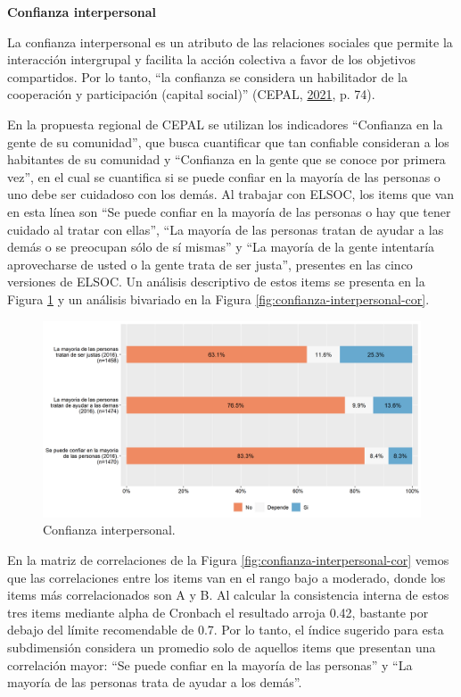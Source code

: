 \documentclass[
  12pt,
]{book}
\begin{document}
\textbf{Confianza interpersonal}

La confianza interpersonal es un atributo de las relaciones sociales que permite la interacción intergrupal y facilita la acción colectiva a favor de los objetivos compartidos. Por lo tanto, ``la confianza se considera un habilitador de la cooperación y participación (capital social)'' (CEPAL, \protect\hyperlink{ref-cepal_cohesion_2021}{2021}, p. 74).

En la propuesta regional de CEPAL se utilizan los indicadores ``Confianza en la gente de su comunidad'', que busca cuantificar que tan confiable consideran a los habitantes de su comunidad y ``Confianza en la gente que se conoce por primera vez'', en el cual se cuantifica si se puede confiar en la mayoría de las personas o uno debe ser cuidadoso con los demás. Al trabajar con ELSOC, los items que van en esta línea son ``Se puede confiar en la mayoría de las personas o hay que tener cuidado al tratar con ellas'', ``La mayoría de las personas tratan de ayudar a las demás o se preocupan sólo de sí mismas'' y ``La mayoría de la gente intentaría aprovecharse de usted o la gente trata de ser justa'', presentes en las cinco versiones de ELSOC. Un análisis descriptivo de estos items se presenta en la Figura \ref{fig:confianza-interpersonal} y un análisis bivariado en la Figura \ref{fig:confianza-interpersonal-cor}.

\begin{figure}[H]

{\centering \includegraphics[width=1\linewidth,height=1\textheight]{output/graphs/confianza-interpersonal} 

}

\caption{Confianza interpersonal.}\label{fig:confianza-interpersonal}
\end{figure}

En la matriz de correlaciones de la Figura \ref{fig:confianza-interpersonal-cor} vemos que las correlaciones entre los items van en el rango bajo a moderado, donde los items más correlacionados son A y B. Al calcular la consistencia interna de estos tres items mediante alpha de Cronbach el resultado arroja 0.42, bastante por debajo del límite recomendable de 0.7. Por lo tanto, el índice sugerido para esta subdimensión considera un promedio solo de aquellos items que presentan una correlación mayor: ``Se puede confiar en la mayoría de las personas'' y ``La mayoría de las personas trata de ayudar a los demás''.
\end{document}
